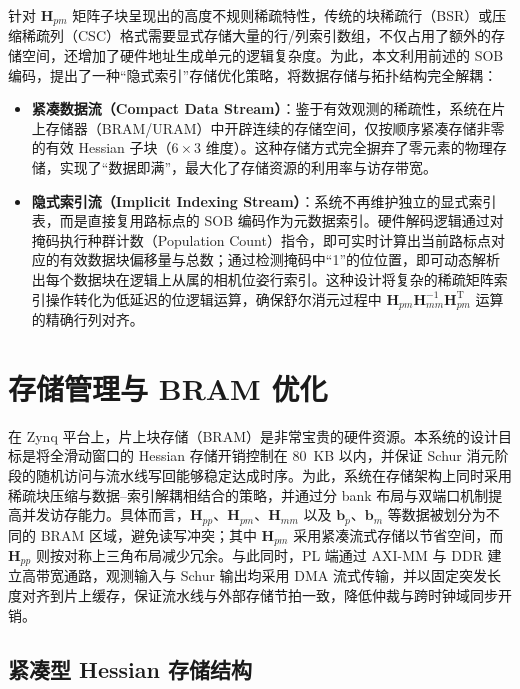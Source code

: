 针对 $\mathbf{H}_{pm}$ 矩阵子块呈现出的高度不规则稀疏特性，传统的块稀疏行（BSR）或压缩稀疏列（CSC）格式\cite{saad2003iterative}需要显式存储大量的行/列索引数组，不仅占用了额外的存储空间，还增加了硬件地址生成单元的逻辑复杂度。为此，本文利用前述的 SOB 编码，提出了一种“隐式索引”存储优化策略，将数据存储与拓扑结构完全解耦：
\begin{itemize}
    \item \textbf{紧凑数据流（Compact Data Stream）}：鉴于有效观测的稀疏性，系统在片上存储器（BRAM/URAM）中开辟连续的存储空间，仅按顺序紧凑存储非零的有效 Hessian 子块（$6\times3$ 维度）。这种存储方式完全摒弃了零元素的物理存储，实现了“数据即满”，最大化了存储资源的利用率与访存带宽。
    \item \textbf{隐式索引流（Implicit Indexing Stream）}：系统不再维护独立的显式索引表，而是直接复用路标点的 SOB 编码作为元数据索引。硬件解码逻辑通过对掩码执行种群计数（Population Count）指令\cite{warren2013hacker}，即可实时计算出当前路标点对应的有效数据块偏移量与总数；通过检测掩码中“1”的位位置，即可动态解析出每个数据块在逻辑上从属的相机位姿行索引。这种设计将复杂的稀疏矩阵索引操作转化为低延迟的位逻辑运算，确保舒尔消元过程中 $\mathbf{H}_{pm}\mathbf{H}_{mm}^{-1}\mathbf{H}_{pm}^{\mathrm{T}}$ 运算的精确行列对齐。
\end{itemize}


\section{存储管理与 BRAM 优化}

在 Zynq 平台上，片上块存储（BRAM）是非常宝贵的硬件资源。本系统的设计目标是将全滑动窗口的 Hessian 存储开销控制在 80~KB 以内，并保证 Schur 消元阶段的随机访问与流水线写回能够稳定达成时序。为此，系统在存储架构上同时采用稀疏块压缩与数据--索引解耦相结合的策略，并通过分 bank 布局与双端口机制提高并发访存能力。具体而言，$\mathbf{H}_{pp}$、$\mathbf{H}_{pm}$、$\mathbf{H}_{mm}$ 以及 $\mathbf{b}_p$、$\mathbf{b}_m$ 等数据被划分为不同的 BRAM 区域，避免读写冲突；其中 $\mathbf{H}_{pm}$ 采用紧凑流式存储以节省空间，而 $\mathbf{H}_{pp}$ 则按对称上三角布局减少冗余。与此同时，PL 端通过 AXI-MM 与 DDR 建立高带宽通路，观测输入与 Schur 输出均采用 DMA 流式传输，并以固定突发长度对齐到片上缓存，保证流水线与外部存储节拍一致，降低仲裁与跨时钟域同步开销。

\subsection{紧凑型 Hessian 存储结构}

